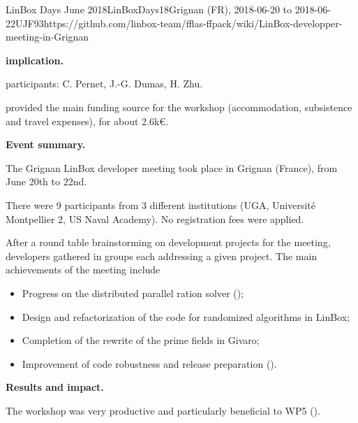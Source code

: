 \begin{event}{LinBox Days June 2018}{LinBoxDays18}{Grignan (FR),
2018-06-20 to 2018-06-22}{UJF}{9}{3}{https://github.com/linbox-team/fflas-ffpack/wiki/LinBox-developper-meeting-in-Grignan}

\textbf{\ODK implication.}

\ODK participants: C. Pernet, J.-G. Dumas, H. Zhu.

\ODK provided the main funding source for the workshop (accommodation,
subsistence and travel expenses), for about 2.6k\euro.

\textbf{Event summary.}

The Grignan LinBox developer meeting took place in Grignan (France), from June
20th to 22nd.

There were 9 participants from 3 different institutions (UGA, Université
Montpellier 2, US Naval Academy).
No registration fees were applied.

After a round table brainstorming on development projects for the meeting,
developers gathered in groups each addressing a given project.
The main achievements of the meeting include
\begin{itemize}
\item Progress on the distributed parallel ration solver ();
\item Design and refactorization of the code for randomized algorithms in LinBox;
\item Completion of the rewrite of the prime fields in Givaro;
\item Improvement of code robustness and release preparation ().
\end{itemize}


\textbf{Results and impact.}

The workshop was very productive and particularly beneficial to WP5 ().
\end{event}
